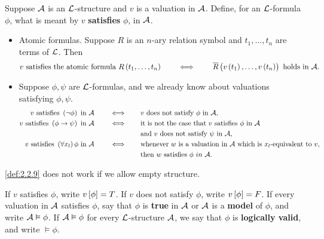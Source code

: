 \begin{definition}
\label{def:2.2.9}
Suppose $ \AA $ is an $ \LL $-structure and $ v $ is a valuation in $ \AA $. Define, for an $ \LL $-formula $ \phi $, what is meant by $ v $ \textbf{satisfies} $ \phi $, in $ \AA $.
\begin{itemize}
\item Atomic formulas. Suppose $ R $ is an $ n $-ary relation symbol and $ t_1, \dots, t_n $ are terms of $ \LL $. Then
$$ v \ \text{satisfies the atomic formula} \ R\br{t_1, \dots, t_n} \qquad \iff \qquad \overline{R}\br{v\br{t_1}, \dots, v\br{t_n}} \ \text{holds in} \ \AA. $$
\item Suppose $ \phi, \psi $ are $ \LL $-formulas, and we already know about valuations satisfying $ \phi, \psi $.
\begin{align*}
v \ \text{satisfies} \ \notb{\phi} \ \text{in} \ \AA \qquad \iff \qquad & v \ \text{does not satisfy} \ \phi \ \text{in} \ \AA, \\
v \ \text{satisfies} \ \impb{\phi}{\psi} \ \text{in} \ \AA \qquad \iff \qquad & \text{it is not the case that} \ v \ \text{satisfies} \ \phi \ \text{in} \ \AA \\
& \text{and} \ v \ \text{does not satisfy} \ \psi \ \text{in} \ \AA, \\
v \ \text{satisfies} \ \fab{x_l}\phi \ \text{in} \ \AA \qquad \iff \qquad & \text{whenever} \ w \ \text{is a valuation in} \ \AA \ \text{which is} \ x_l \text{-equivalent to} \ v, \\
& \text{then} \ w \ \text{satisfies} \ \phi \ in \ \AA.
\end{align*}
\end{itemize}
\end{definition}


\begin{remark*}
\ref{def:2.2.9} does not work if we allow empty structure.
\end{remark*}

\begin{notation*}
If $ v $ satisfies $ \phi $, write $ v\sbr{\phi} = T $. If $ v $ does not satisfy $ \phi $, write $ v\sbr{\phi} = F $. If every valuation in $ \AA $ satisfies $ \phi $, say that $ \phi $ is \textbf{true} in $ \AA $ or $ \AA $ is a \textbf{model} of $ \phi $, and write $ \AA \vDash \phi $. If $ \AA \vDash \phi $ for every $ \LL $-structure $ \AA $, we say that $ \phi $ is \textbf{logically valid}, and write $ \vDash \phi $.
\end{notation*}

